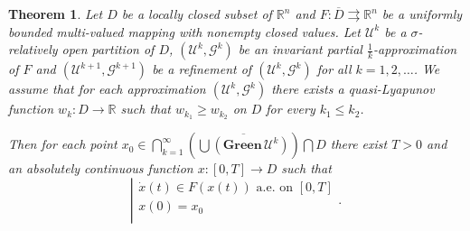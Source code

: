 \documentclass[a4paper]{article}
\newtheorem{thm}{Theorem}[section]
\begin{document}
\begin{thm}\label{sol}
    Let $D$ be a locally closed subset of $\mathbb{R}^n$ and $F : \overline{D} \rightrightarrows \mathbb{R}^n$ be a uniformly bounded multi-valued mapping with nonempty closed values. Let $\mathcal{U}^k$ be a $\sigma$-relatively open partition of $D$, $(\mathcal{U}^k,\mathcal{G}^k)$ be an invariant partial $\frac{1}{k}$-approximation of $F$ and $(\mathcal{U}^{k+1},\mathcal{G}^{k+1})$ be a refinement of $(\mathcal{U}^k,\mathcal{G}^k)$ for all $k=1,2,\dots$. We assume that for each approximation $(\mathcal{U}^k,\mathcal{G}^k)$ there exists a quasi-Lyapunov function $w_k : D \to \mathbb{R}$ such that $w_{k_1} \ge w_{k_2}$ on $D$ for every $k_1 \le k_2$.

    Then for each point $x_0 \in \bigcap_{k=1}^{\infty}\left(\overline{\bigcup(\mathbf{Green} \,\mathcal{U}^k)}\right) \bigcap D$ there exist $T>0$ and an absolutely continuous function $x : [0,T] \to D$ such that
    $$\left| \begin{array}{l}
    \dot{x}(t) \in F(x(t)) \text{ a.e. on } [0,T]\\
    x(0) = x_0\\
    \end{array} \right..$$
\end{thm}
\end{document}
